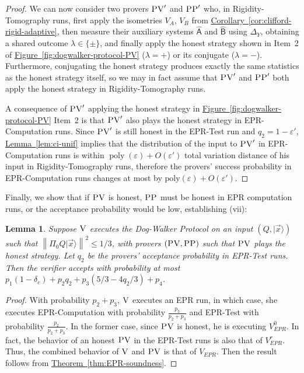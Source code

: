 \documentclass[11pt]{article}
\numberwithin{equation}{section}
\newtheorem{lemma}[theorem]{Lemma}
\theoremstyle{definition}
\theoremstyle{plain}
\newcommand{\expref}[2]{\hyperref[#2]{#1~\ref{#2}}}
\newcommand{\ket}[1]{|#1\rangle}
\DeclareMathOperator{\poly}{poly}
\newcommand{\reg}[1]{{\textsf{#1}}}
\newcommand{\norm}[1]{\left\|#1\right\|}
\newcommand{\eps}{\varepsilon}
\newcommand{\ver}{\textsc{V}}
\newcommand{\pv}{\textsc{PV}}
\newcommand{\pp}{\textsc{PP}}
\begin{document}
\begin{proof}
We can now consider two provers $\pv'$ and $\pp'$ who, in Rigidity-Tomography runs, first apply the isometries $V_A$, $V_B$ from \expref{Corollary}{cor:clifford-rigid-adaptive}, then  measure their auxiliary systems $\hat{\reg{A}}$ and $\hat{\reg{B}}$ using $\Delta_Y$, obtaining a shared outcome $\lambda\in\{\pm\}$, and finally apply the honest strategy shown in Item~2 of \expref{Figure}{fig:dogwalker-protocol-PV} ($\lambda=+$) or its conjugate ($\lambda = -$). Furthermore, conjugating the honest strategy produces exactly the same statistics as the honest strategy itself, so we may in fact assume that $\pv'$ and $\pp'$ both apply the honest strategy in Rigidity-Tomography runs. 


A consequence of $\pv'$ applying the honest strategy in \expref{Figure}{fig:dogwalker-protocol-PV} Item~2 is that $\pv'$ also plays the honest strategy in EPR-Computation runs. Since $\pv'$ is still honest in the EPR-Test run and $q_2 = 1-\eps'$, \expref{Lemma}{lem:ci-unif} implies that the distribution of the input to $\pv'$ in EPR-Computation runs is within $\poly(\eps)+O(\eps')$ total variation distance of his input in
Rigidity-Tomography runs, therefore the provers' success probability in EPR-Computation runs changes at most by $\mathrm{poly}(\eps)+O(\eps')$. 
\end{proof}


Finally, we show that if $\pv$ is honest, $\pp$ must be honest in EPR computation runs, or the acceptance probability would be low, establishing (vii):
\begin{lemma}\label{lem:PP-3}
Suppose $\ver$ executes the Dog-Walker Protocol on an input $(Q,\ket{\vec{x}})$ such that $\norm{\Pi_0 Q\ket{\vec{x}}}^2\leq 1/3$, with provers $(\pv,\pp)$ such that $\pv$ plays the honest strategy. Let $q_2$ be the provers' acceptance probability in EPR-Test runs. Then the verifier accepts with probability at most
  $p_1(1-\delta_c) +p_2q_2+p_3(5/3-4q_2/3)+p_4$. 
\end{lemma}
\begin{proof}
With probability $p_2+p_3$, $\ver$ executes an EPR run, in which case, she executes EPR-Computation with probability $\frac{p_3}{p_2+p_3}$ and EPR-Test with probability $\frac{p_2}{p_2+p_3}$. In the former case, since $\pv$ is honest, he is executing $V_{EPR}^0$. In fact, the behavior of an honest $\pv$ in the EPR-Test runs is also that of $V_{EPR}^r$. Thus, the combined behavior of $\ver$ and $\pv$ is that of $V_{EPR}$. Then the result follows from \expref{Theorem}{thm:EPR-soundness}. 
\end{proof}
\end{document}
